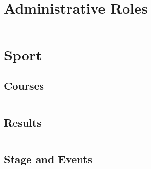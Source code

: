 \documentclass[
    a4paper,
    oneside,
    10pt
]{article}
\newenvironment{timeline}{%
	\begin{longtable}{ c | c }%
}{%
	\end{longtable}%
}
\begin{document}
    \section{Administrative Roles}
    \begin{timeline}
    		
    \end{timeline}
    
    \section{Sport}
    	\subsection{Courses}
    	\begin{timeline}
    		
    \end{timeline}
    
    	\subsection{Results}
    	\begin{timeline}
    		
    \end{timeline}
    
    \subsection{Stage and Events}
    	\begin{timeline}
    		
    \end{timeline}
    
    \pagebreak
    \tableofcontents
\end{document}
